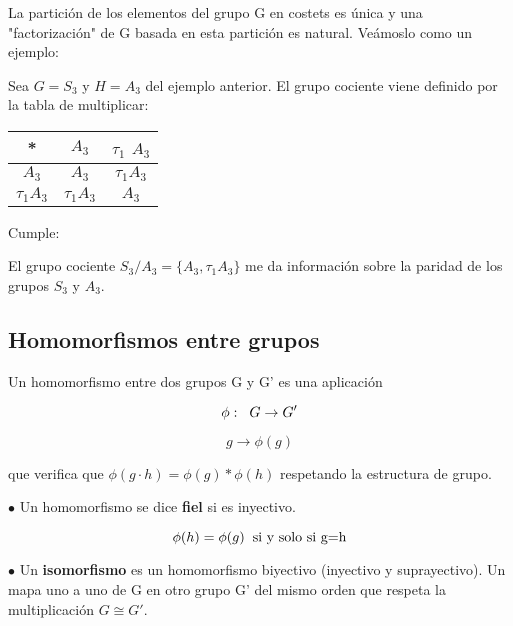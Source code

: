 \documentclass{article}
\begin{document}
 La partición de los elementos del grupo G en costets es única y una "factorización" de G basada en esta partición es natural. Veámoslo como un ejemplo:
 
 \smallskip
 Sea $G=S_3$ y $H=A_3$ del ejemplo anterior. El grupo cociente viene definido por la tabla de multiplicar:
 \begin{center}
\begin{tabular}[b]{ c | c c}
 * & $A_3$ & $\tau _1$ $A_3$\\
 \hline
 $A_3$ & $A_3$ & $\tau _1 A_3$ \\
 
 $\tau _1 A_3$ & $\tau _1 A_3$ & $A_3$
 \end{tabular}
 
 \end{center}
 
 
 Cumple:
 
 
 \smallskip
 El grupo cociente $S_3/A_3= \lbrace A_3, \tau _1 A_3\rbrace $ me da información sobre la paridad de los grupos $S_3$ y $A_3$.
 
 \subsection{Homomorfismos entre grupos}
 Un homomorfismo entre dos grupos G y G' es una aplicación 
 
 $$\phi : \hspace{0.2cm} G \rightarrow G'$$
 
 $$g\rightarrow \phi(g)$$
 
 que verifica que $\phi (g\cdot h)=\phi (g)*\phi (h)$ respetando la estructura de grupo.
 
 \smallskip
$\bullet$ Un homomorfismo se dice \textbf{fiel} si es inyectivo.
 
 $$\phi (h)=\phi (g) \hspace{0.2cm} \text{si y solo si g=h}$$
 
 \smallskip
$\bullet$ Un \textbf{isomorfismo} es un homomorfismo biyectivo (inyectivo y suprayectivo). Un mapa uno a uno de G en otro grupo G' del mismo orden que respeta la multiplicación $G\cong G'$.
 
\end{document}
